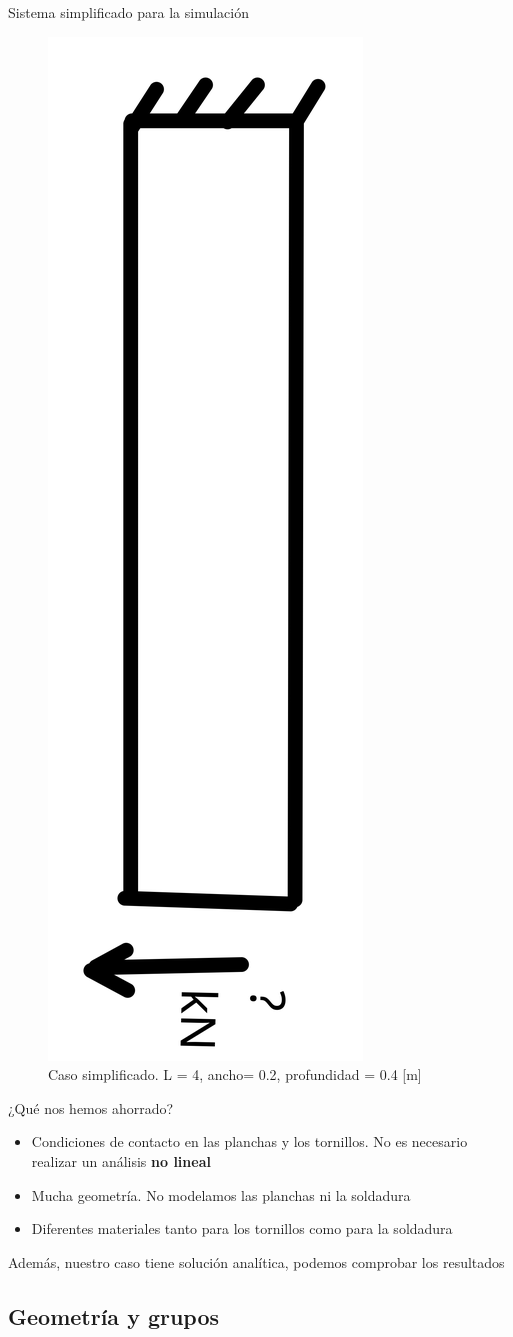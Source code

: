 \documentclass[12pt]{beamer}
\begin{document}
\begin{frame}{Sistema simplificado para la simulación}
	\begin{figure}
		\centering
		\includegraphics[width=0.3\linewidth,angle=90]{simplifiedcase}
		\caption{Caso simplificado. L = 4, ancho= 0.2, profundidad = 0.4 [m]}
		\label{fig:simplifiedcase}
	\end{figure}
\end{frame}

\begin{frame}{¿Qué nos hemos ahorrado?}
	\begin{itemize}[label=$\checkmark$]
		\item Condiciones de contacto en las planchas y los tornillos. No es necesario realizar un análisis \textbf{no lineal}
		\item Mucha geometría. No modelamos las planchas ni la soldadura
		\item Diferentes materiales tanto para los tornillos como para la soldadura
	\end{itemize}
	Además, nuestro caso tiene solución analítica, podemos comprobar los resultados
\end{frame}

\subsection{Geometría y grupos}
\end{document}
